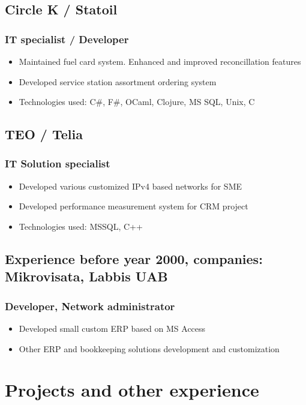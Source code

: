 \documentclass[11pt]{article}
\begin{document}
\subsection{Circle K / Statoil}
\subsubsection{IT specialist / Developer }
\begin{itemize}
\item Maintained fuel card system. Enhanced and improved reconcillation features
\item Developed service station assortment ordering system
\item Technologies used: C\#, F\#, OCaml, Clojure, MS SQL, Unix, C
\end{itemize}

\subsection{TEO / Telia}
\subsubsection{IT Solution specialist }
\begin{itemize}
\item Developed various customized IPv4 based networks for SME
\item Developed performance measurement system for CRM project
\item Technologies used: MSSQL, C++
\end{itemize}

\subsection{Experience before year 2000, companies: Mikrovisata, Labbis UAB}
\subsubsection{Developer, Network administrator }
\begin{itemize}
\item Developed small custom ERP based on MS Access
\item Other ERP and bookkeeping solutions development and customization
\end{itemize}


\section{Projects and other experience}
\end{document}
